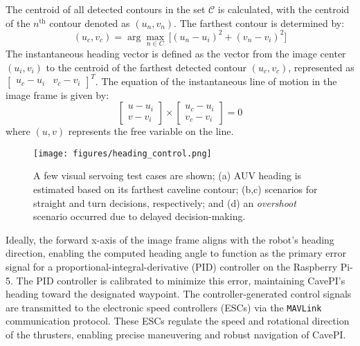 The centroid of all detected contours in the set $\mathcal{C}$ is calculated, with the centroid of the $n^{\text{th}}$ contour denoted as \((u_n, v_n)\). The farthest contour is determined by:
\begin{equation*}
(u_c, v_c) = \arg\max_{n \in C}\, \big[{(u_n - u_i)^2 + (v_n - v_i)^2}\big]
\end{equation*}
The instantaneous heading vector is defined as the vector from the image center \( (u_i, v_i) \) to the centroid of the farthest detected contour \( (u_c, v_c) \), represented as $\begin{bmatrix} u_c - u_i & v_c - v_i \end{bmatrix}^T$. The equation of the instantaneous line of motion in the image frame is given by:
\begin{equation*}
\begin{bmatrix} u - u_i \\ v - v_i \end{bmatrix} \times \begin{bmatrix} u_c - u_i \\ v_c - v_i \end{bmatrix} = 0
\end{equation*}
where \( (u, v) \) represents the free variable on the line. 

\begin{figure}[t]
    \centering
    \texttt{[image: figures/heading\_control.png]}%
    \vspace{-1mm}
    \caption{A few visual servoing test cases are shown; (a) AUV heading is estimated based on its farthest caveline contour; (b,c) scenarios for straight and turn decisions, respectively; and (d) an \textit{overshoot} scenario occurred due to delayed decision-making.
    }
    \label{fig:heading_control}
    \vspace{-2mm}
\end{figure}

Ideally, the forward x-axis of the image frame aligns with the robot's heading direction, enabling the computed heading angle to function as the primary error signal for a proportional-integral-derivative (PID) controller on the Raspberry Pi-5. The PID controller is calibrated to minimize this error, maintaining CavePI’s heading toward the designated waypoint. The controller-generated control signals are transmitted to the electronic speed controllers (ESCs) via the {\tt MAVLink} communication protocol. These ESCs regulate the speed and rotational direction of the thrusters, enabling precise maneuvering and robust navigation of CavePI.

